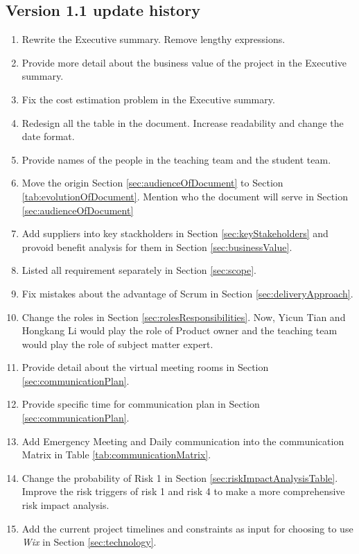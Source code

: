 \subsection{Version 1.1 update history}
\label{sec:v1-1Up}
  \begin{enumerate}
    \item Rewrite the Executive summary. Remove lengthy expressions.
    \item Provide more detail about the business value of the project in the Executive summary.
    \item Fix the cost estimation problem in the Executive summary.
    \item Redesign all the table in the document. Increase readability and change the date format.
    \item Provide names of the people in the teaching team and the student team.
    \item Move the origin Section \ref{sec:audienceOfDocument} to Section \ref{tab:evolutionOfDocument}. Mention who the document will serve in Section \ref{sec:audienceOfDocument}
    \item Add suppliers into key stackholders in Section \ref{sec:keyStakeholders} and provoid benefit analysis for them in Section \ref{sec:businessValue}.
    \item Listed all requirement separately in Section \ref{sec:scope}.
    \item Fix mistakes about the advantage of Scrum in Section \ref{sec:deliveryApproach}.
    \item Change the roles in Section \ref{sec:rolesResponsibilities}. Now, Yicun Tian and Hongkang Li would play the role of Product owner and the teaching team would play the role of subject matter expert.
    \item Provide detail about the virtual meeting rooms in Section \ref{sec:communicationPlan}.
    \item Provide specific time for communication plan in Section \ref{sec:communicationPlan}.
    \item Add Emergency Meeting and Daily communication into the communication Matrix in Table \ref{tab:communicationMatrix}.
    \item Change the probability of Risk 1 in Section \ref{sec:riskImpactAnalysisTable}. Improve the risk triggers of risk 1 and risk 4 to make a more comprehensive risk impact analysis.
	  \item Add the current project timelines and constraints as input for choosing to use \textit{Wix} in Section \ref{sec:technology}.

\end{enumerate}
